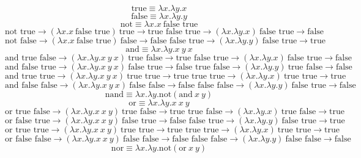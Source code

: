 \documentclass{article}
\begin{document}
\[\text{true}\equiv\lambda x.\lambda y.x\]
\[\text{false}\equiv\lambda x.\lambda y.y\]
\newline
\[\text{not}\equiv\lambda x.x\ \text{false true}\]
\newline
\[\text{not true}\to(\lambda x.x\ \text{false true})\ \text{true}\to\text{true false true}\to(\lambda x.\lambda y.x)\ \text{false true}\to\text{false}\]
\[\text{not false}\to(\lambda x.x\ \text{false true})\ \text{false}\to\text{false false true}\to(\lambda x.\lambda y.y)\ \text{false true}\to\text{true}\]
\newline
\[\text{and}\equiv\lambda x.\lambda y.x\ y\ x\]
\newline
\[\text{and true false}\to(\lambda x.\lambda y.x\ y\ x)\ \text{true false}\to\text{true false true}\to(\lambda x.\lambda y.x)\ \text{false true}\to\text{false}\]
\[\text{and false true}\to(\lambda x.\lambda y.x\ y\ x)\ \text{false true}\to\text{false true false}\to(\lambda x.\lambda y.y)\ \text{true false}\to\text{false}\]
\[\text{and true true}\to(\lambda x.\lambda y.x\ y\ x)\ \text{true true}\to\text{true true true}\to(\lambda x.\lambda y.x)\ \text{true true}\to\text{true}\]
\[\text{and false false}\to(\lambda x.\lambda y.x\ y\ x)\ \text{false false}\to\text{false false false}\to(\lambda x.\lambda y.y)\ \text{false true}\to\text{false}\]
\newline
\[\text{nand}\equiv\lambda x.\lambda y.\text{not}(\text{and}\ x\ y)\]
\newline
\[\text{or}\equiv\lambda x.\lambda y.x\ x\ y\]
\newline
\[\text{or true false}\to(\lambda x.\lambda y.x\ x\ y)\ \text{true false}\to\text{true true false}\to(\lambda x.\lambda y.x)\ \text{true false}\to\text{true}\]
\[\text{or false true}\to(\lambda x.\lambda y.x\ x\ y)\ \text{false true}\to\text{false false true}\to(\lambda x.\lambda y.y)\ \text{false true}\to\text{true}\]
\[\text{or true true}\to(\lambda x.\lambda y.x\ x\ y)\ \text{true true}\to\text{true true true}\to(\lambda x.\lambda y.x)\ \text{true true}\to\text{true}\]
\[\text{or false false}\to(\lambda x.\lambda y.x\ x\ y)\ \text{false false}\to\text{false false false}\to(\lambda x.\lambda y.y)\ \text{false false}\to\text{false}\]
\newline
\[\text{nor}\equiv\lambda x.\lambda y.\text{not}(\text{or}\ x\ y)\]
\end{document}
